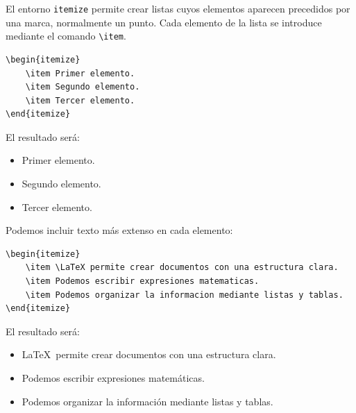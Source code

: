 \documentclass[11pt,a4paper]{article}
\theoremstyle{plain}
\theoremstyle{definition}
\theoremstyle{remark}
\theoremstyle{exercise}
\begin{document}
El entorno \verb|itemize| permite crear listas cuyos elementos aparecen precedidos por una marca, normalmente un punto. Cada elemento de la lista se introduce mediante el comando \verb|\item|.

\begin{lstlisting}
\begin{itemize}
    \item Primer elemento.
    \item Segundo elemento.
    \item Tercer elemento.
\end{itemize}
\end{lstlisting}

\noindent El resultado será:

\begin{paginarecuadrada}
\begin{itemize}
    \item Primer elemento.
    \item Segundo elemento.
    \item Tercer elemento.
\end{itemize}
\end{paginarecuadrada}

\noindent Podemos incluir texto más extenso en cada elemento:

\begin{lstlisting}
\begin{itemize}
    \item \LaTeX permite crear documentos con una estructura clara.
    \item Podemos escribir expresiones matematicas.
    \item Podemos organizar la informacion mediante listas y tablas.
\end{itemize}
\end{lstlisting}

\noindent El resultado será:

\begin{paginarecuadrada}
\begin{itemize}
    \item \LaTeX\ permite crear documentos con una estructura clara.
    \item Podemos escribir expresiones matemáticas.
    \item Podemos organizar la información mediante listas y tablas.
\end{itemize}
\end{paginarecuadrada}
\end{document}

